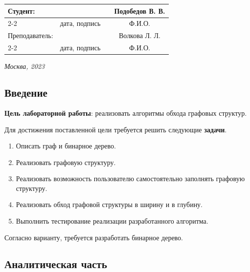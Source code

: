 \documentclass[12pt, a4paper]{article}
\begin{document}
\begin{titlepage}
  \fontsize{14}{21}\selectfont
  \vspace{5cm}


  \noindent\begin{tabularx}{\textwidth}{ X >{\centering}p{4cm} p{1cm} c }
   Студент: & & & Подобедов В. В. \\ \cline{2-2} \cline{4-4}
   & \fontsize{10}{15}\selectfont дата, подпись & & \fontsize{10}{15}\selectfont Ф.И.О. \\
   Преподаватель: & & & Волкова Л. Л.\\ \cline{2-2} \cline{4-4}
   & \fontsize{10}{15}\selectfont дата, подпись & & \fontsize{10}{15}\selectfont Ф.И.О.
  \end{tabularx}

  \vspace{\fill}

  \begin{center}
   \it{Москва}, 2023
  \end{center}

  \thispagestyle{empty}
\end{titlepage}

\renewcommand{\contentsname}{Содержание}
\setcounter{page}{2}
\tableofcontents

\newpage
\begin{center}
   \section*{Введение} 
\end{center}
\justifying
\textbf{Цель лабораторной работы}: реализовать алгоритмы обхода графовых структур.

Для достижения поставленной цели требуется решить следующие \textbf{задачи}.
\begin{enumerate}
\item Описать граф и бинарное дерево.
\item Реализовать графовую структуру.
\item Реализовать возможность пользователю самостоятельно заполнять графовую структуру.
\item Реализовать обход графовой структуры в ширину и в глубину.
\item Выполнить тестирование реализации разработанного алгоритма.
\end{enumerate}

Согласно варианту, требуется разработать бинарное дерево.

\newpage
\begin{center}
   \section{Аналитическая часть} 
\end{center}
\end{document}
